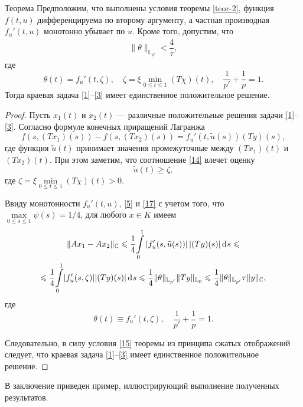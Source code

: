 \documentclass[press]{vestnik}
\begin{document}
\begin{prop}[3]{Теорема} \label{teor-3}
Предположим, что выполнены условия теоремы \ref{teor-2}, функция $f(t,u)$ дифференцируема по второму аргументу, а частная производная $f_u'(t,u)$  монотонно убывает по $u$. Кроме того, допустим, что
\begin{gather}
\|\theta\|_{\mathbb{L}_{p'}}<\dfrac {4}{\tau}, \label{15}
\end{gather}
где 
\[
\theta(t)= f_u'(t,\zeta),\quad \zeta=\xi\min_{0\leqslant t\leqslant1}(T\chi)(t), \quad \frac1{p'}+\frac1p=1.
\]
Тогда краевая задача \eqref{1}--\eqref{3} имеет единственное положительное решение.
\end{prop}
\begin{proof}
Пусть $x_1(t)$ и $x_2(t)$ --- различные положительные решения задачи \eqref{1}--\eqref{3}. Согласно формуле конечных приращений Лагранжа
\begin{equation}
f \left (s,\left(Tx_1 \right)(s) \right)-f \left (s,\left(Tx_2 \right)(s) \right)=f_u'(t,\tilde{u}(s))(Ty)(s), \label{16}
\end{equation}
где функция $\tilde{u}(t)$ принимает значения промежуточные между $(Tx_1)(t)$ и $(Tx_2)(t)$. При этом заметим, что соотношение \eqref{14} влечет оценку
\begin{equation}
\tilde{u}(t)\geqslant \zeta, \label{17}
\end{equation}
где $\zeta=\xi\min\limits_{0\leqslant t\leqslant1}(T\chi)(t)>0$.

Ввиду монотонности $f_u'(t,u)$, \eqref{5} и \eqref{17} с учетом того, что $\max\limits_{0\leqslant s\leqslant 1}\psi(s)=1/4$, для любого $x\in K$ имеем
\begin{multline*}
\|Ax_1-Ax_2\|_{\mathbb{C}}\leqslant \frac14 {\int\limits_0^1} \left|f_u'(s,\tilde{u}(s))\right| \left|(Ty)(s)\right|\d s\leqslant\\
\leqslant \frac14 {\int\limits_0^1} |f_u'(s,\zeta)| |(Ty)(s)|\d s\leqslant \frac14\|\theta\|_{\mathbb{L}_{p'}} \|Ty\|_{\mathbb{L}_p}\leqslant \frac14\|\theta\|_{\mathbb{L}_{p'}} \tau\|y\|_{\mathbb{C}},
\end{multline*}
где 
\[
\theta(t)\equiv f_u'(t,\zeta),\quad \frac1{p'}+\frac1p=1.
\]

Следовательно, в силу условия \eqref{15} теоремы из принципа сжатых отображений следует, что краевая задача \eqref{1}--\eqref{3} имеет единственное положительное решение.
\end{proof}


В заключение приведен пример, иллюстрирующий выполнение полученных результатов.
\end{document}
